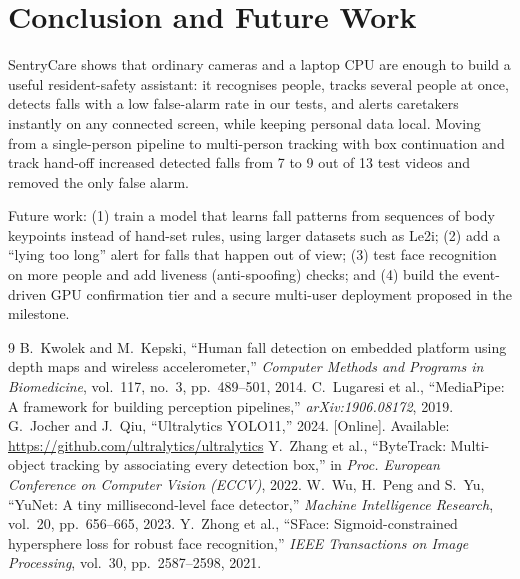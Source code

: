 \documentclass[11pt,a4paper]{article}
\begin{document}
\section{Conclusion and Future Work}

SentryCare shows that ordinary cameras and a laptop CPU are enough to build a useful resident-safety assistant: it
recognises people, tracks several people at once, detects falls with a low false-alarm rate in our tests, and alerts
caretakers instantly on any connected screen, while keeping personal data local. Moving from a single-person
pipeline to multi-person tracking with box continuation and track hand-off increased detected falls from 7 to 9 out of
13 test videos and removed the only false alarm.

Future work: (1) train a model that learns fall patterns from sequences of body keypoints instead of hand-set rules,
using larger datasets such as Le2i; (2) add a ``lying too long'' alert for falls that happen out of view; (3) test face
recognition on more people and add liveness (anti-spoofing) checks; and (4) build the event-driven GPU confirmation
tier and a secure multi-user deployment proposed in the milestone.

\begin{thebibliography}{9}
 B.~Kwolek and M.~Kepski, ``Human fall detection on embedded platform using depth maps and
wireless accelerometer,'' \emph{Computer Methods and Programs in Biomedicine}, vol.~117, no.~3, pp.~489--501, 2014.
 C.~Lugaresi et al., ``MediaPipe: A framework for building perception pipelines,''
\emph{arXiv:1906.08172}, 2019.
 G.~Jocher and J.~Qiu, ``Ultralytics YOLO11,'' 2024. [Online]. Available:
\url{https://github.com/ultralytics/ultralytics}
 Y.~Zhang et al., ``ByteTrack: Multi-object tracking by associating every detection box,''
in \emph{Proc. European Conference on Computer Vision (ECCV)}, 2022.
 W.~Wu, H.~Peng and S.~Yu, ``YuNet: A tiny millisecond-level face detector,''
\emph{Machine Intelligence Research}, vol.~20, pp.~656--665, 2023.
 Y.~Zhong et al., ``SFace: Sigmoid-constrained hypersphere loss for robust face recognition,''
\emph{IEEE Transactions on Image Processing}, vol.~30, pp.~2587--2598, 2021.
\end{thebibliography}
\end{document}
